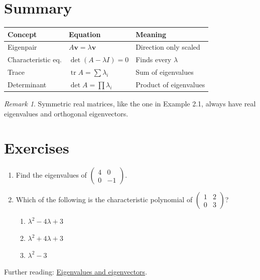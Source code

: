 \documentclass[11pt,a4paper]{article}
\theoremstyle{plain}
\theoremstyle{remark}
\newtheorem*{remark}{Remark}
\begin{document}
\section{Summary}

\begin{table}[h]
    \centering
    \begin{tabular}{@{}lll@{}}
        \toprule
        \textbf{Concept} & \textbf{Equation} & \textbf{Meaning} \\
        \midrule
        Eigenpair            & $A\mathbf{v} = \lambda\mathbf{v}$  & Direction only scaled \\
        Characteristic eq.   & $\det(A - \lambda I) = 0$          & Finds every $\lambda$ \\
        Trace                & $\operatorname{tr} A = \sum \lambda_i$ & Sum of eigenvalues \\
        Determinant          & $\det A = \prod \lambda_i$         & Product of eigenvalues \\
        \bottomrule
    \end{tabular}
\end{table}

\begin{remark}
Symmetric real matrices, like the one in Example 2.1, always have real eigenvalues and orthogonal eigenvectors.
\end{remark}

\section{Exercises}

\begin{enumerate}
    \item Find the eigenvalues of $\begin{pmatrix} 4 & 0 \\ 0 & -1 \end{pmatrix}$.
    \item Which of the following is the characteristic polynomial of $\begin{pmatrix} 1 & 2 \\ 0 & 3 \end{pmatrix}$?
    \begin{enumerate}[label=\alph*),leftmargin=1.5em,topsep=0.3em,itemsep=0.15em]
        \item $\lambda^2 - 4\lambda + 3$
        \item $\lambda^2 + 4\lambda + 3$
        \item $\lambda^2 - 3$
    \end{enumerate}
\end{enumerate}

\vspace{1em}
\noindent Further reading: \href{https://en.wikipedia.org/wiki/Eigenvalues_and_eigenvectors}{Eigenvalues and eigenvectors}.
\end{document}
